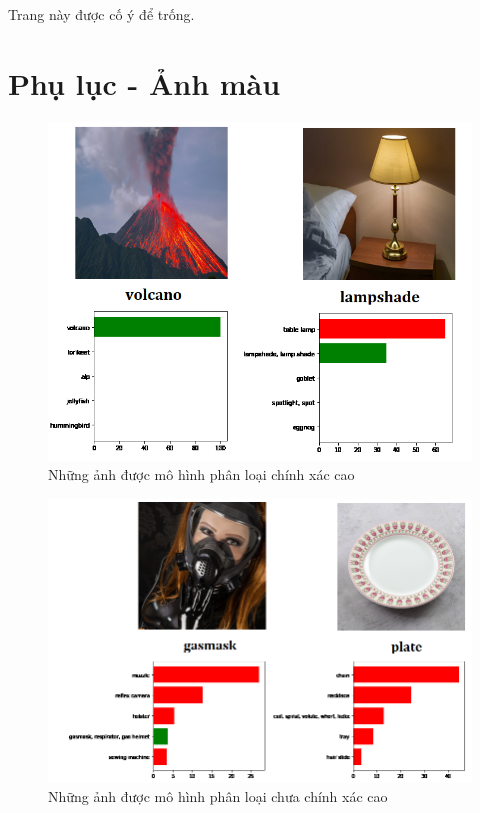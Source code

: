 \documentclass[a4paper]{article}
\begin{document}
\newpage
\vspace*{\fill}
{\centering Trang này được cố ý để trống.\par}
\vspace{\fill}
\newpage

\section{Phụ lục - Ảnh màu}
\begin{figure}[h!]
\centering
\includegraphics[width=15cm]{images/res1.PNG}
\caption*{Những ảnh được mô hình phân loại chính xác cao}
\end{figure}

\clearpage

\begin{figure}[h!]
\centering
\includegraphics[width=15cm]{images/res2.PNG}
\caption*{Những ảnh được mô hình phân loại chưa chính xác cao}
\end{figure}
\end{document}
